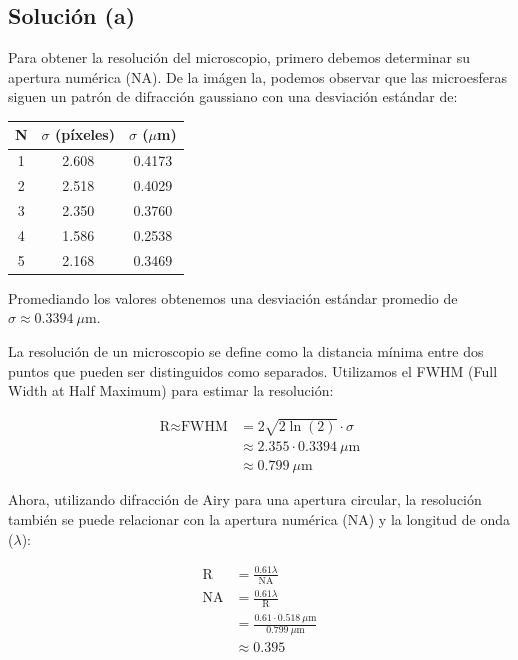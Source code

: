 \documentclass[11pt]{article}
\begin{document}
\subsection*{Solución (a)}

Para obtener la resolución del microscopio, primero debemos determinar su apertura numérica (NA). De la imágen la, podemos observar que las microesferas siguen un patrón de difracción gaussiano con una desviación estándar de:

\begin{center}
\begin{tabular}{|c|c|c|}
    \hline
    \textbf{N} & \textbf{$\sigma$ (píxeles)} & \textbf{$\sigma$ ($\mu$m)} \\
    \hline
    1 & 2.608 & 0.4173 \\
    2 & 2.518 & 0.4029 \\
    3 & 2.350 & 0.3760 \\
    4 & 1.586 & 0.2538 \\
    5 & 2.168 & 0.3469 \\
    \hline
\end{tabular}
\end{center}

Promediando los valores obtenemos una desviación estándar promedio de $\sigma \approx 0.3394\ \mu$m.

La resolución de un microscopio se define como la distancia mínima entre dos puntos que pueden ser distinguidos como separados. Utilizamos el FWHM (Full Width at Half Maximum) para estimar la resolución:

\begin{align*}
    \text{R} \approx \text{FWHM} &= 2 \sqrt{2 \ln(2)} \cdot \sigma \\
    &\approx 2.355 \cdot 0.3394\ \mu\text{m} \\
    &\approx 0.799\ \mu\text{m}
\end{align*}

Ahora, utilizando difracción de Airy para una apertura circular, la resolución también se puede relacionar con la apertura numérica (NA) y la longitud de onda ($\lambda$):

\begin{align*}
    \text{R} &= \frac{0.61 \lambda}{\text{NA}} \\
    \text{NA} &= \frac{0.61 \lambda}{\text{R}} \\
    &= \frac{0.61 \cdot 0.518\ \mu\text{m}}{0.799\ \mu\text{m}} \\
    &\approx 0.395
\end{align*}
\end{document}
